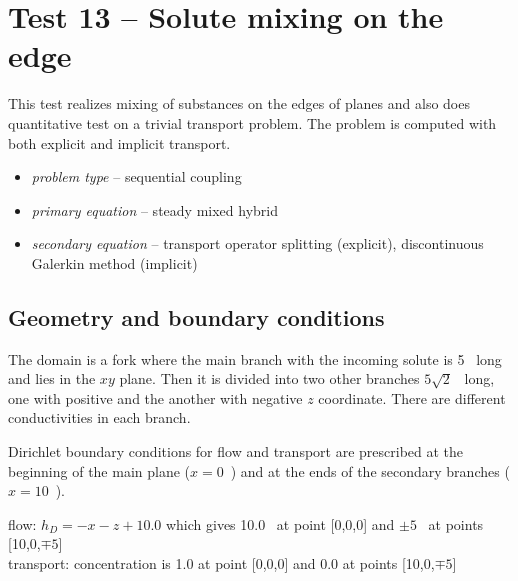 

\section{Test 13 -- Solute mixing on the edge}
This test realizes mixing of substances on the edges of planes and also does quantitative test on a trivial 
transport problem. The problem is computed with both explicit and implicit transport.

\begin{itemize} 
    \item \emph{problem type} -- sequential coupling 
    \item \emph{primary equation} -- steady mixed hybrid
    \item \emph{secondary equation} -- transport operator splitting (explicit), discontinuous Galerkin method (implicit)
  \end{itemize}

\subsection*{Geometry and boundary conditions}
The domain is a fork where the main branch with the incoming solute is 5~ long and lies in 
the $xy$ plane. Then it is divided into two other branches $5\sqrt{2}$~ long, one with 
positive and the another with negative $z$ coordinate. There are different conductivities in each branch.

Dirichlet boundary conditions for flow and transport are prescribed at the beginning of the main 
plane ($x=0$~) and at the ends of the secondary branches ($x=10$~).

flow: $h_D=-x-z+10.0$ which gives 10.0~ at point [0,0,0] and $\pm5$~ at points [10,0,$\mp5$]\\
transport: concentration is 1.0 at point [0,0,0] and 0.0 at points [10,0,$\mp5$]

